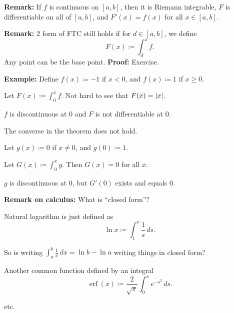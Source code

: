 \documentclass[10pt,aspectratio=149]{beamer}
\begin{document}
\begin{frame}

\textbf{Remark:}
If $f$ is continuous on $[a,b]$,
\pause
then it is Riemann integrable,
\pause
$F$ is differentiable on all of $[a,b]$,
\pause
and $F'(x) = f(x)$ for
all $x \in [a,b]$.

\pause
\medskip

\textbf{Remark:}
2 form of FTC still holds if for
$d \in [a,b]$, we define
\begin{equation*}
F(x) \coloneqq \int_d^x f .
\end{equation*}
\pause
Any point can be the base point.
\pause
\textbf{Proof:} Exercise.

\pause
\medskip

\textbf{Example:}
Define $f(x) \coloneqq -1$ if $x
< 0$, and $f(x) \coloneqq 1$ if $x \geq 0$.

\pause
Let $F(x) \coloneqq \int_0^x f$.
\pause
\qquad Not hard to see that $F(x) = \left\lvert {x} \right\rvert$.

\pause
$f$ is discontinuous at $0$ and $F$ is not differentiable at $0$.

\pause
\medskip

The converse in the theorem does not hold.

\pause
Let $g(x) \coloneqq 0$ if $x \not= 0$, and $g(0) \coloneqq 1$.

\pause
Let $G(x) \coloneqq \int_0^x g$. \qquad
\pause
Then $G(x) = 0$ for all $x$.

\pause
$g$ is discontinuous at $0$, but $G'(0)$ exists and equals 0.

\end{frame}

\begin{frame}

\textbf{Remark on calculus:}
What is ``closed form''?

\pause
\medskip

Natural logarithm is just defined as
\begin{equation*}
\ln x \coloneqq \int_1^x \frac{1}{s}\,ds .
\end{equation*}

\pause
So is writing $\int_a^b \frac{1}{x} \,dx = \ln b-\ln a$ writing things in
closed form?

\pause
\medskip

Another common function defined by an integral
\begin{equation*}
\operatorname{erf}(x) \coloneqq \frac{2}{\sqrt{\pi}} \int_0^x e^{-s^2} \,ds .
\end{equation*}

\pause
\medskip

etc.

\end{frame}
\end{document}

